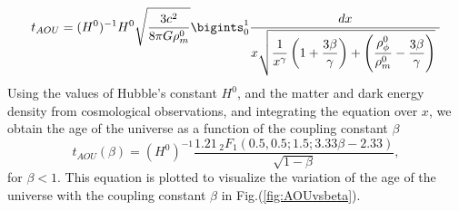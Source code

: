 \documentclass[preprint,aps,floatfix]{revtex4}
\begin{document}
    \begin{equation*}
        t_{AOU} = (H^0)^{-1} H^0\sqrt{\frac{3c^2}{8\pi G\rho_m^0}}\bigints_0^1 \frac{dx}{  x \sqrt{\displaystyle \frac{1}{x^{\gamma}} \left(1 + \frac{3\beta}{\gamma} \right) +\left(\frac{\rho_\phi^0}{\rho_m^0} -\frac{3\beta }{\gamma}\right) }  ~}
    \end{equation*}
    Using the values of Hubble's constant $H^0$, and the matter and dark energy density from cosmological observations, and integrating the equation over $x$, we obtain the age of the universe as a function of the coupling constant $\beta$
    \begin{equation}
        t_{AOU}(\beta)= (H^0)^{-1}\frac{1.21 \, _2F_1(0.5,0.5;1.5;3.33 \beta-2.33)}{\sqrt{1 -\beta}},
    \end{equation}
    for $\beta < 1$. This equation is plotted to visualize the variation of the age of the universe with the coupling constant $\beta$ in Fig.(\ref{fig:AOUvsbeta}). \\
\end{document}
